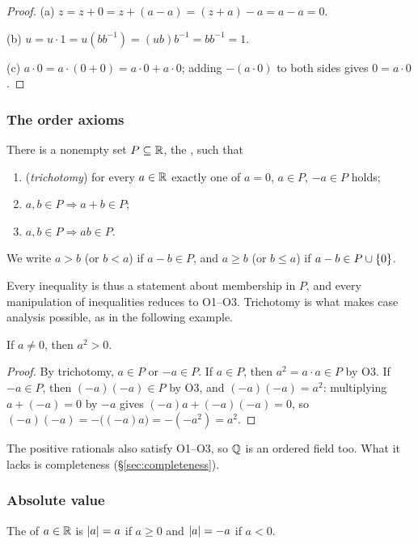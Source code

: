 \begin{proof}
    (a) $z = z + 0 = z + (a - a) = (z + a) - a = a - a = 0$.

    (b) $u = u \cdot 1 = u (b b^{-1}) = (u b) b^{-1} = b b^{-1} = 1$.

    (c) $a\cdot0=a\cdot(0+0)=a\cdot0+a\cdot0$; adding $-(a\cdot0)$ to both
    sides gives $0=a\cdot0$.
\end{proof}

\subsubsection{The order axioms}
\begin{definition}\label{def:order}
    There is a nonempty set $P\subseteq\mathbb{R}$, the , such that
    \begin{enumerate}[label=\textbf{O\arabic*.}, leftmargin=2.5em]
        \item (\emph{trichotomy}) for every $a \in \mathbb{R}$ exactly one of
        $a = 0$, $a \in P$, $-a \in P$ holds;
        \item $a, b \in P \Rightarrow a + b \in P$;
        \item $a, b \in P \Rightarrow a b \in P$.
    \end{enumerate}
    We write $a>b$ (or $b<a$) if $a-b\in P$, and $a\geq b$ (or $b\leq a$)
    if $a-b\in P\cup\left\{0\right\}$.
\end{definition}

Every inequality is thus a statement about membership in $P$, and every
manipulation of inequalities reduces to O1--O3. Trichotomy is what makes
case analysis possible, as in the following example.

\begin{example}
    If $a\neq0$, then $a^2>0$.
\end{example}

\begin{proof}
    By trichotomy, $a\in P$ or $-a\in P$. If $a\in P$, then $a^2=a\cdot a\in
    P$ by O3. If $-a\in P$, then $(-a)(-a)\in P$ by O3, and
    $(-a)(-a)=a^2$: multiplying $a+(-a)=0$ by $-a$ gives
    $(-a)a+(-a)(-a)=0$, so $(-a)(-a)=-\bigl((-a)a\bigr)=-(-a^2)=a^2$.
\end{proof}

The positive rationals also satisfy O1--O3, so $\mathbb{Q}$ is an ordered field
too. What it lacks is completeness (\S\ref{sec:completeness}).

\subsubsection{Absolute value}
\begin{definition}
    The  of $a\in\mathbb{R}$ is
    $\left|a\right| = a$ if $a \geq 0$ and $\left|a\right| = -a$ if $a < 0$.
\end{definition}

